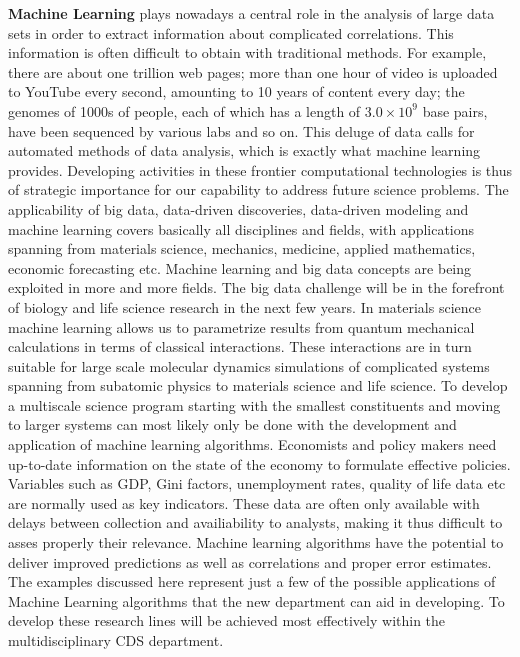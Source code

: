 \documentclass[]{article}
\begin{document}
\textbf{Machine Learning} plays nowadays a central role in the analysis
of large data sets in order to extract information about complicated
correlations. This information is often difficult to obtain with
traditional methods. For example, there are about one trillion web
pages; more than one hour of video is uploaded to YouTube every second,
amounting to 10 years of content every day; the genomes of 1000s of
people, each of which has a length of \(3.0\times 10^9\) base pairs,
have been sequenced by various labs and so on. This deluge of data calls
for automated methods of data analysis, which is exactly what machine
learning provides. Developing activities in these frontier computational
technologies is thus of strategic importance for our capability to
address future science problems. The applicability of big data,
data-driven discoveries, data-driven modeling and machine learning
covers basically all disciplines and fields, with applications spanning
from materials science, mechanics, medicine, applied mathematics,
economic forecasting etc. Machine learning and big data concepts are
being exploited in more and more fields. The big data challenge will be
in the forefront of biology and life science research in the next few
years. In materials science machine learning allows us to parametrize
results from quantum mechanical calculations in terms of classical
interactions. These interactions are in turn suitable for large scale
molecular dynamics simulations of complicated systems spanning from
subatomic physics to materials science and life science. To develop a
multiscale science program starting with the smallest constituents and
moving to larger systems can most likely only be done with the
development and application of machine learning algorithms. Economists
and policy makers need up-to-date information on the state of the
economy to formulate effective policies. Variables such as GDP, Gini
factors, unemployment rates, quality of life data etc are normally used
as key indicators. These data are often only available with delays
between collection and availiability to analysts, making it thus
difficult to asses properly their relevance. Machine learning algorithms
have the potential to deliver improved predictions as well as
correlations and proper error estimates. The examples discussed here
represent just a few of the possible applications of Machine Learning
algorithms that the new department can aid in developing. To develop
these research lines will be achieved most effectively within the
multidisciplinary CDS department.
\end{document}
